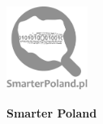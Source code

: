 \documentclass[\main/boa.tex]{subfiles}
\begin{document}
	
	\begin{minipage}[t]{0.915\textwidth}
		\center     
		\includegraphics[width=100px]{img/logos.bw/smarterpoland_logo.png} 
	\end{minipage}
	
	\Large \textbf {Smarter Poland}
	
	
	\vskip 0.3cm
	\normalsize 
\vskip 1.5cm
\end{document}
